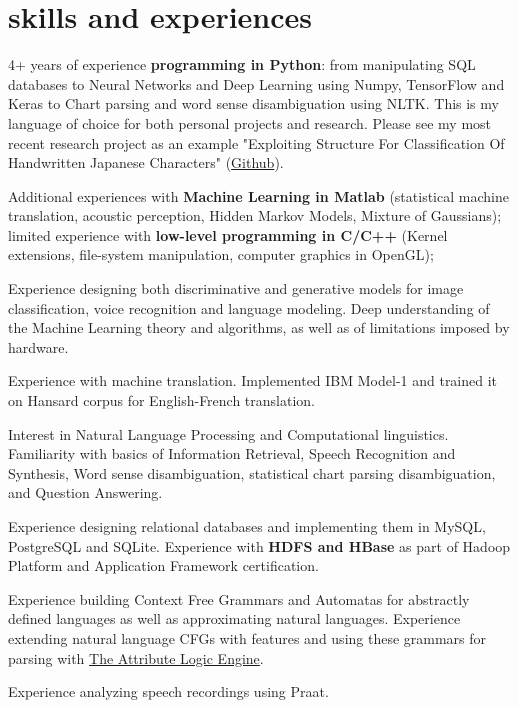 \documentclass[]{cv-roald}
\begin{document}
\section*{skills and experiences}
\begin{tabitemize}
    \item 4+ years of experience \textbf{programming in Python}: from manipulating SQL databases to Neural Networks and Deep Learning using Numpy, TensorFlow and Keras to Chart parsing and word sense disambiguation using NLTK. This is my language of choice for both personal projects and research. Please see my most recent research project as an example "Exploiting Structure For Classification Of Handwritten Japanese Characters" (\href{https://github.com/balayanr/kanji_recognition_412}{Github}).
    \item
    Additional experiences with \textbf{Machine Learning in Matlab}
    (statistical machine translation, acoustic perception, Hidden Markov Models, Mixture of Gaussians);
    limited experience with \textbf{low-level programming in C/C++}
    (Kernel extensions, file-system manipulation, computer graphics in OpenGL);
    \item Experience designing both discriminative and generative models for image classification, voice recognition and language modeling. Deep understanding of the Machine Learning theory and algorithms, as well as of limitations imposed by hardware.
    \item Experience with machine translation. Implemented IBM Model-1 and trained it on Hansard corpus for English-French translation.
    \item Interest in Natural Language Processing and Computational linguistics. Familiarity with basics of Information Retrieval, Speech Recognition and Synthesis, Word sense disambiguation, statistical chart parsing disambiguation, and Question Answering.
    \item Experience designing relational databases and implementing them in MySQL, PostgreSQL and SQLite. Experience with \textbf{HDFS and HBase} as part of Hadoop Platform and Application Framework certification.
    \item Experience building Context Free Grammars and Automatas for abstractly defined languages as well as approximating natural languages. Experience extending natural language CFGs with features and using these grammars for parsing with \href{http://www.cs.toronto.edu/~gpenn/ale.html}{The Attribute Logic Engine}.
    \item Experience analyzing speech recordings using Praat.

\end{tabitemize}
\clearpage
\end{document}
